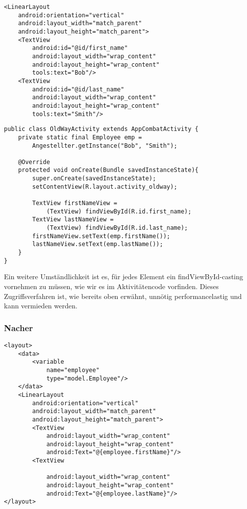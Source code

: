 \documentclass[FIPLY_base.tex]{subfiles}
\begin{document}
\begin{lstlisting}[caption={XML Datei vor dem Einsatz von Databinding.},label=DescriptiveLabel]
<LinearLayout
	android:orientation="vertical"
	android:layout_width="match_parent"
	android:layout_height="match_parent">
	<TextView
		android:id="@id/first_name"
		android:layout_width="wrap_content"
		android:layout_height="wrap_content"
		tools:text="Bob"/>
	<TextView
		android:id="@id/last_name"
		android:layout_width="wrap_content"
		android:layout_height="wrap_content"
		tools:text="Smith"/>	
\end{lstlisting}


\begin{lstlisting}[caption={Die Activity vor dem Einsatz von DataBinding.},label=DescriptiveLabel]
public class OldWayActivity extends AppCombatActivity {
	private static final Employee emp = 
		Angestellter.getInstance("Bob", "Smith");
	
	@Override
	protected void onCreate(Bundle savedInstanceState){
		super.onCreate(savedInstanceState);
		setContentView(R.layout.activity_oldway);
		
		TextView firstNameView = 
			(TextView) findViewById(R.id.first_name);
		TextView lastNameView = 
			(TextView) findViewById(R.id.last_name);
		firstNameView.setText(emp.firstName());
		lastNameView.setText(emp.lastName());
	}
}
\end{lstlisting}


Ein weitere Umständlichkeit ist es, für jedes Element ein findViewById-casting vornehmen zu müssen, wie wir es im Aktivitätencode vorfinden. Dieses Zugriffsverfahren ist, wie bereits oben erwähnt, unnötig performancelastig und kann vermieden werden.
\subsubsection{Nacher}

\begin{lstlisting}[caption={XML Datei nach dem Einsatz von Databinding.},label=DescriptiveLabel]
<layout>
	<data>
		<variable
			name="employee"
			type="model.Employee"/>
	</data>
	<LinearLayout
		android:orientation="vertical"
		android:layout_width="match_parent"
		android:layout_height="match_parent">
		<TextView
			android:layout_width="wrap_content"
			android:layout_height="wrap_content"
			android:Text="@{employee.firstName}"/>
		<TextView
	
			android:layout_width="wrap_content"
			android:layout_height="wrap_content"
			android:Text="@{employee.lastName}"/>
</layout>	
\end{lstlisting}
\end{document}
